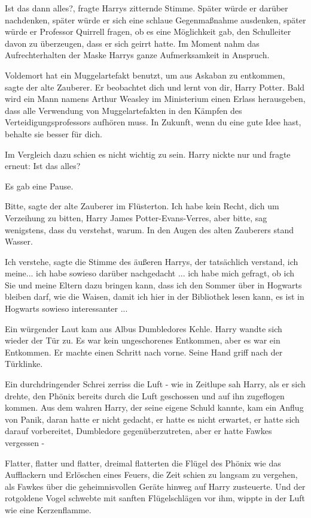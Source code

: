 \glqq{}Ist das dann alles?\grqq{}, fragte Harrys zitternde Stimme. Später würde
er darüber nachdenken, später würde er sich eine schlaue Gegenmaßnahme
ausdenken, später würde er Professor Quirrell fragen, ob es eine Möglichkeit
gab, den Schulleiter davon zu überzeugen, dass er sich geirrt hatte. Im Moment
nahm das Aufrechterhalten der Maske Harrys ganze Aufmerksamkeit in Anspruch.

\glqq{}Voldemort hat ein Muggelartefakt benutzt, um aus Askaban zu
entkommen\grqq{}, sagte der alte Zauberer. \glqq{}Er beobachtet dich und lernt
von dir, Harry Potter. Bald wird ein Mann namens Arthur Weasley im Ministerium
einen Erlass herausgeben, dass alle Verwendung von Muggelartefakten in den
Kämpfen des Verteidigungsprofessors aufhören muss. In Zukunft, wenn du eine gute
Idee hast, behalte sie besser für dich.\grqq{}

Im Vergleich dazu schien es nicht wichtig zu sein. Harry nickte nur und fragte
erneut: \glqq{}Ist das alles?\grqq{}

Es gab eine Pause.

\glqq{}Bitte\grqq{}, sagte der alte Zauberer im Flüsterton. \glqq{}Ich habe kein
Recht, dich um Verzeihung zu bitten, Harry James Potter-Evans-Verres, aber
bitte, sag wenigstens, dass du verstehst, warum.\grqq{} In den Augen des alten
Zauberers stand Wasser.

\glqq{}Ich verstehe\grqq{}, sagte die Stimme des äußeren Harrys, der tatsächlich
verstand, \glqq{}ich meine... ich habe sowieso darüber nachgedacht ... ich habe
mich gefragt, ob ich Sie und meine Eltern dazu bringen kann, dass ich den Sommer
über in Hogwarts bleiben darf, wie die Waisen, damit ich hier in der Bibliothek
lesen kann, es ist in Hogwarts sowieso interessanter ...\grqq{}

Ein würgender Laut kam aus Albus Dumbledores Kehle. Harry wandte sich wieder der
Tür zu. Es war kein ungeschorenes Entkommen, aber es war ein Entkommen. Er
machte einen Schritt nach vorne. Seine Hand griff nach der Türklinke.

Ein durchdringender Schrei zerriss die Luft - wie in Zeitlupe sah Harry, als er
sich drehte, den Phönix bereits durch die Luft geschossen und auf ihn zugeflogen
kommen. Aus dem wahren Harry, der seine eigene Schuld kannte, kam ein Anflug von
Panik, daran hatte er nicht gedacht, er hatte es nicht erwartet, er hatte sich
darauf vorbereitet, Dumbledore gegenüberzutreten, aber er hatte Fawkes vergessen
-

Flatter, flatter und flatter, dreimal flatterten die Flügel des Phönix wie das
Aufflackern und Erlöschen eines Feuers, die Zeit schien zu langsam zu vergehen,
als Fawkes über die geheimnisvollen Geräte hinweg auf Harry zusteuerte. Und der
rotgoldene Vogel schwebte mit sanften Flügelschlägen vor ihm, wippte in der Luft
wie eine Kerzenflamme.

